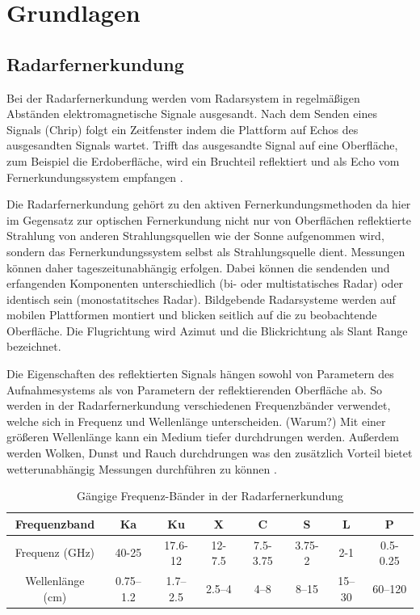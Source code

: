 \newpage
\restoregeometry
\section{Grundlagen}
\subsection{Radarfernerkundung}
Bei der Radarfernerkundung werden vom Radarsystem in regelmäßigen Abständen elektromagnetische Signale ausgesandt. Nach dem Senden eines Signals 
(Chrip) folgt ein Zeitfenster indem die Plattform auf Echos des ausgesandten Signals wartet.
Trifft das ausgesandte Signal auf eine Oberfläche, zum Beispiel 
die Erdoberfläche, wird ein Bruchteil reflektiert und als Echo vom Fernerkundungssystem empfangen \cite{tutorial_on_sar}.

Die Radarfernerkundung gehört zu den aktiven Fernerkundungsmethoden da hier im Gegensatz zur optischen Fernerkundung nicht nur 
von Oberflächen reflektierte Strahlung von anderen Strahlungsquellen wie der Sonne aufgenommen wird, sondern das Fernerkundungssystem 
selbst als Strahlungsquelle dient. Messungen können daher tageszeitunabhängig erfolgen. Dabei können die sendenden und erfangenden Komponenten 
unterschiedlich (bi- oder multistatisches Radar) oder identisch sein (monostatitsches Radar). Bildgebende Radarsysteme werden auf mobilen Plattformen 
montiert und blicken seitlich auf die zu beobachtende Oberfläche. Die Flugrichtung wird Azimut und die Blickrichtung als Slant Range bezeichnet. 

Die Eigenschaften des reflektierten Signals hängen sowohl von Parametern des Aufnahmesystems als von Parametern der reflektierenden Oberfläche ab.
So werden in der Radarfernerkundung verschiedenen Frequenzbänder verwendet, welche sich in Frequenz und Wellenlänge unterscheiden. (Warum?) 
Mit einer größeren Wellenlänge kann ein Medium tiefer durchdrungen werden. Außerdem werden Wolken, Dunst und Rauch durchdrungen was den zusätzlich Vorteil bietet
wetterunabhängig Messungen durchführen zu können \cite{einfuehrung_in_fernerkundung}.

\begin{table}[htb]
    \caption{Gängige Frequenz-Bänder in der Radarfernerkundung}
\begin{center}
    \begin{tabular}{|c|c|c|c|c|c|c|c|} 
        Frequenzband & Ka & Ku & X & C & S & L & P\\ 
        \hline
        Frequenz (GHz) & 40-25 & 17.6-12 & 12-7.5 & 7.5-3.75 & 3.75-2 & 2-1 & 0.5-0.25\\ 
        Wellenlänge (cm) & 0.75–1.2 & 1.7–2.5 & 2.5–4 & 4–8 & 8–15 & 15–30 & 60–120\\ 
    \end{tabular}
    \label{table:1}
\end{center}
\end{table}

